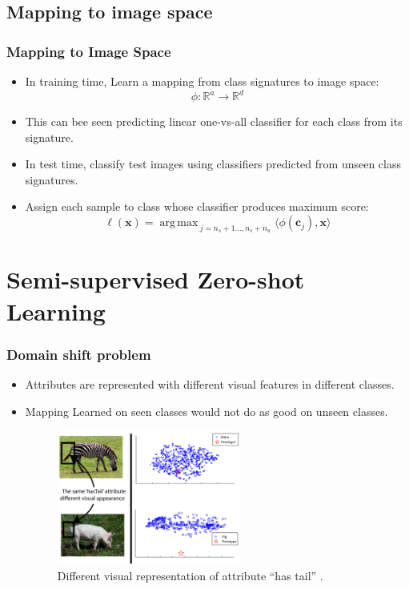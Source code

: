 \documentclass{beamer}
\DeclareMathOperator*{\argmax}{arg\,max\,}
\begin{document}
\subsection{Mapping to image space}
\begin{frame}
  \frametitle{Mapping to Image Space}
\begin{itemize}
    \item In training time, Learn a mapping from class signatures to image space:
    \[ \phi: \mathbb{R}^{a} \to \mathbb{R}^d \]
    \item This can bee seen predicting linear one-vs-all classifier for each class from its signature.
    \item In test time, classify test images using classifiers predicted from unseen class signatures.
    \item Assign each sample to class whose classifier produces maximum score:
    \begin{equation}
      \ell(\mathbf{x}) = \argmax_{j=n_s+1 \ldots, n_s + n_u} \langle \phi(\mathbf{c}_j), \mathbf{x} \rangle
    \end{equation}
\end{itemize}
\end{frame}

\section{Semi-supervised Zero-shot Learning}
\label{sec:Semi-supervised Zero-shot Learning}
\begin{frame}\frametitle{Domain shift problem}
  \begin{itemize}
    \item Attributes are represented with different visual features in different classes.
    \item Mapping Learned on seen classes would not do as good on unseen classes.

    \begin{figure}
      \centering
      \includegraphics[width=6cm]{domain-shift.png}
      \caption{\scriptsize
      Different visual representation of attribute ``has tail'' \cite{Fu2014}.
      }
    \end{figure}
  \end{itemize}

\end{frame}
\end{document}
